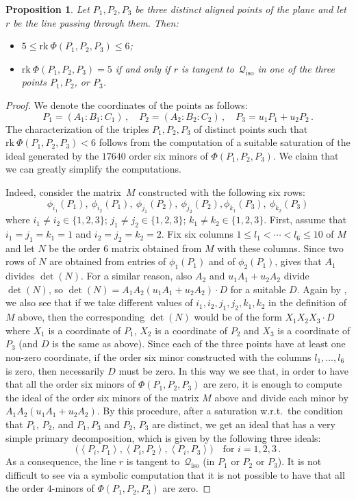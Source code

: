 \documentclass{amsart}
\theoremstyle{plain}
\newtheorem{prop}[lemma]{Proposition}
\theoremstyle{definition}
\newcommand{\iso}{\mathcal{Q}_{\mathrm{iso}}}
\newcommand{\scl}[2]{\left\langle {#1}, {#2} \right\rangle}
\newcommand{\rk}{\ensuremath{\mathrm{rk}}}
\begin{document}
\begin{prop}
\label{proposition:three_aligned_ranks}
Let $P_1, P_2, P_3$ be three distinct aligned points of the plane and let
$r$ be the line passing through them. Then:
\begin{itemize}
\item $5 \leq \rk \ \Phi(P_1, P_2, P_3) \leq 6$;
\item
$\rk \ \Phi(P_1, P_2, P_3) = 5$ if and only if $r$ is tangent
to~$\iso$ in one of the three points $P_1, P_2$, or $P_3$.
\end{itemize}
\end{prop}
\begin{proof} We denote the coordinates of the points as follows:
%
\[
P_1 = (A_1: B_1: C_1) \,, \quad P_2 = (A_2: B_2: C_2) \,, \quad P_3 = u_1P_1+u_2P_2 \,.
\]
%
The characterization of the triples $P_1, P_2, P_3$ of distinct points such that $\rk \ \Phi(P_1, P_2, P_3) < 6$ follows from the computation of a suitable saturation of the ideal generated by the $17640$ order six minors of $\Phi(P_1, P_2, P_3)$.
We claim that we can greatly simplify the computations.

Indeed, consider the matrix~$M$ constructed with the following six rows:
\[
\phi_{i_1}(P_1), \ \phi_{i_2}(P_1), \ \phi_{j_1}(P_2),\ \phi_{j_2}(P_2),
\phi_{k_1}(P_3), \ \phi_{k_2}(P_3)
\]
where $i_1 \not= i_2 \in \{1, 2, 3\}$; $j_1 \not= j_2 \in \{1, 2, 3\}$;
$k_1 \not= k_2 \in \{1, 2, 3\}$.
First, assume that $i_1=j_1=k_1=1$ and
$i_2=j_2=k_2=2$. Fix six columns
$1\leq l_1 < \cdots < l_6 \leq 10$ of $M$ and let $N$ be the order $6$ matrix
obtained from $M$ with these columns. Since two rows of $N$ are obtained from
entries of $\phi_1(P_1)$ and of $\phi_2(P_1)$,
 gives that $A_1$ divides $\det(N)$. For a similar
reason, also $A_2$ and $u_1A_1+u_2A_2$ divide $\det(N)$, so
$\det(N) = A_1A_2(u_1A_1+u_2A_2)\cdot D$ for a suitable $D$.
Again by , we also see that if we take different values of
$i_1, i_2, j_1, j_2, k_1, k_2$ in the definition of $M$ above, then
the corresponding $\det(N)$ would be of the form $X_1X_2X_3\cdot D$ where
$X_1$ is a coordinate of $P_1$, $X_2$ is a coordinate of $P_2$ and $X_3$ is
a coordinate of $P_3$ (and $D$ is the same as above). Since each of the three
points have at least one non-zero coordinate, if the order six minor
constructed with the columns $l_1, \dots, l_6$ is zero, then necessarily $D$
must be zero. In this way we see that, in order to have that all the order
six minors of $\Phi(P_1, P_2, P_3)$ are zero, it is enough to compute the
ideal of the order six minors of the matrix $M$ above and divide each
minor by $A_1A_2(u_1A_1+u_2A_2)$. By this procedure, after
a saturation w.r.t.\ the condition that $P_1$, $P_2$, and $P_1, P_3$ and
$P_2$, $P_3$ are distinct, we get an ideal that has
a very simple primary decomposition, which is given by the following three
ideals:
%
\[
\bigl( \scl{P_i}{P_1}, \scl{P_i}{P_2}, \scl{P_i}{P_3} \bigr) \quad
\mbox{for } i = 1, 2, 3 \,.
\]
%
As a consequence, the line $r$ is tangent to~$\iso$
(in $P_1$ or $P_2$ or $P_3$).
It is not difficult to see via a symbolic computation that it is not possible to have that all the order
$4$-minors of $\Phi(P_1, P_2, P_3)$ are zero.
\end{proof}
\end{document}

